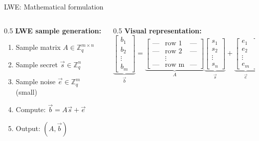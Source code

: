\ifdefined\PRESENTATION\else\PassOptionsToClass{handout}{beamer}\fi\documentclass[aspectratio=169, lualatex]{beamer}
\begin{document}
\begin{frame}{LWE: Mathematical formulation}
	\begin{columns}[c]
		\begin{column}{0.5\textwidth}
			\textbf{LWE sample generation:}
			\begin{enumerate}
				\item Sample matrix $A \in \mathbb{Z}_q^{m \times n}$
				\item Sample secret $\vec{s} \in \mathbb{Z}_q^n$
				\item Sample noise $\vec{e} \in \mathbb{Z}_q^m$ (small)
				\item Compute: $\vec{b} = A\vec{s} + \vec{e}$
				\item Output: $(A, \vec{b})$
			\end{enumerate}
		\end{column}
		\begin{column}{0.5\textwidth}
			\textbf{Visual representation:}
			\[
				\underbrace{\begin{bmatrix}
						b_1    \\
						b_2    \\
						\vdots \\
						b_m
					\end{bmatrix}}_{\vec{b}}
				=
				\underbrace{\begin{bmatrix}
						\text{---} & \text{row 1} & \text{---} \\
						\text{---} & \text{row 2} & \text{---} \\
						           & \vdots       &            \\
						\text{---} & \text{row m} & \text{---}
					\end{bmatrix}}_{A}
				\underbrace{\begin{bmatrix}
						s_1    \\
						s_2    \\
						\vdots \\
						s_n
					\end{bmatrix}}_{\vec{s}}
				+
				\underbrace{\begin{bmatrix}
						e_1    \\
						e_2    \\
						\vdots \\
						e_m
					\end{bmatrix}}_{\vec{e}}
			\]
		\end{column}
	\end{columns}
\end{frame}
\end{document}
